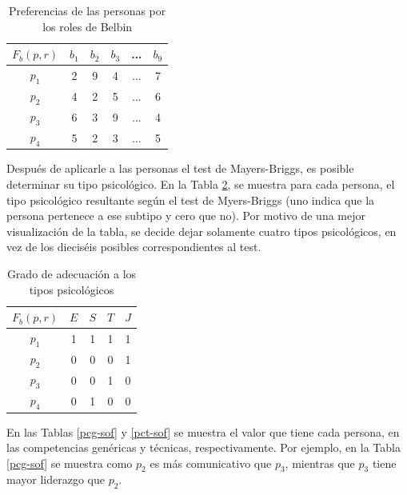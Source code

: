 \begin{table}[H]
  \centering
  \caption{Preferencias de las personas por los roles de Belbin}\label{prb-sof}
\begin{tabular}{|c|c|c|c|c|c|}
	\hline
	$F_b(p,r)$ & $b_1$ & $b_2$ & $b_3$ & ... & $b_9$ \\ \hline
	  $p_1$    &   2   &   9   &   4   & ... &   7   \\ \hline
	  $p_2$    &   4   &   2   &   5   & ... &   6   \\ \hline
	  $p_3$    &   6   &   3   &   9   & ... &   4   \\ \hline
	  $p_4$    &   5   &   2   &   3   & ... &   5   \\ \hline
\end{tabular}
\end{table}



Después de aplicarle a las personas el test de Mayers-Briggs, es posible determinar su tipo psicológico. En la Tabla \ref{prps-sof}, se muestra para cada persona, el tipo psicológico resultante según el test de Myers-Briggs (uno indica que la persona pertenece a ese subtipo y cero que no). Por motivo de una mejor visualización de la tabla, se decide dejar solamente cuatro tipos psicológicos, en vez de los dieciséis posibles correspondientes al test.
\begin{table}[H]
  \centering
  \caption{Grado de adecuación a los tipos psicológicos}\label{prps-sof}
\begin{tabular}{|c|c|c|c|c|}
	\hline
	$F_b(p,r)$ & $E$ & $S$ & $T$ & $J$ \\ \hline
	  $p_1$    &  1  &  1  &  1  &  1  \\ \hline
	  $p_2$    &  0  &  0  &  0  &  1  \\ \hline
	  $p_3$    &  0  &  0  &  1  &  0  \\ \hline
	  $p_4$    &  0  &  1  &  0  &  0  \\ \hline
\end{tabular}
\end{table}


En las Tablas \ref{pcg-sof} y \ref{pct-sof} se muestra el valor que tiene cada persona, en las competencias genéricas y técnicas, respectivamente. Por ejemplo, en la Tabla \ref{pcg-sof} se muestra como $p_2$ es más comunicativo que $p_3$, mientras que $p_3$ tiene mayor liderazgo que $p_2$.


